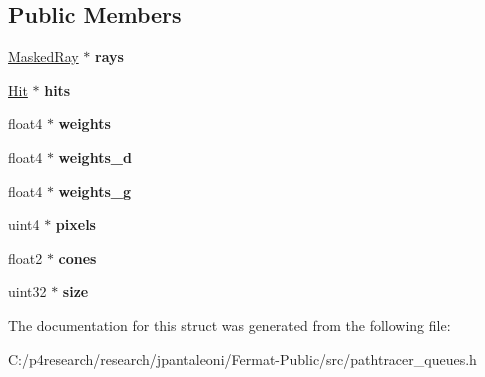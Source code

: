 \subsection*{Public Members}
\begin{DoxyCompactItemize}
\item 
\mbox{\label{struct_p_t_ray_queue_a50c36644ff617e7d31877f2b7bc846e9}} 
\hyperlink{struct_masked_ray}{Masked\+Ray} $\ast$ {\bfseries rays}
\item 
\mbox{\label{struct_p_t_ray_queue_a9bef005df970aed0778679ed3677c1e4}} 
\hyperlink{struct_hit}{Hit} $\ast$ {\bfseries hits}
\item 
\mbox{\label{struct_p_t_ray_queue_a6f4898183dc5a730e00931732a68fee6}} 
float4 $\ast$ {\bfseries weights}
\item 
\mbox{\label{struct_p_t_ray_queue_ac9373c04bb1b46923eb67cb4d4e7df79}} 
float4 $\ast$ {\bfseries weights\+\_\+d}
\item 
\mbox{\label{struct_p_t_ray_queue_ab6b0e303e20568e23a2ff5f2848f705d}} 
float4 $\ast$ {\bfseries weights\+\_\+g}
\item 
\mbox{\label{struct_p_t_ray_queue_ad2c279fe4c74ec555d599438ab8021d1}} 
uint4 $\ast$ {\bfseries pixels}
\item 
\mbox{\label{struct_p_t_ray_queue_a91f323703fecdfb8141a5d5fea79b4b9}} 
float2 $\ast$ {\bfseries cones}
\item 
\mbox{\label{struct_p_t_ray_queue_a1f996121a4f1c9e74fefaa46b65b76b3}} 
uint32 $\ast$ {\bfseries size}
\end{DoxyCompactItemize}


The documentation for this struct was generated from the following file\+:\begin{DoxyCompactItemize}
\item 
C\+:/p4research/research/jpantaleoni/\+Fermat-\/\+Public/src/pathtracer\+\_\+queues.\+h\end{DoxyCompactItemize}
